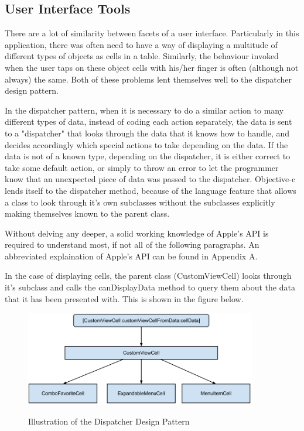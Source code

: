 \documentclass[se]{uw-wkrpt}
\begin{document}
\subsection{User Interface Tools}

There are a lot of similarity between facets of a user interface. Particularly in this
application, there was often need to have a way of displaying a multitude of different
types of objects as cells in a table. Similarly, the behaviour invoked when the user
taps on these object cells with his/her finger is often (although not always) the same.
Both of these problems lent themselves well to the dispatcher design pattern. 

In the dispatcher pattern,
when it is necessary to do a similar action to many different types of data, instead of coding
each action separately, the data is sent to a "dispatcher" that looks through the data that
it knows how to handle, and decides accordingly which special actions to take depending on
the data. If the data is not of a known type, depending on the dispatcher, it is either correct
to take some default action, or simply to throw an error to let the programmer know that 
an unexpected piece of data was passed to the dispatcher. Objective-c lends itself to the 
dispatcher method, because of the language feature that allows a class to look through it's
own subclasses without the subclasses explicitly making themselves known to the parent class.

Without delving any deeper, a solid working knowledge of Apple's API is required to understand
most, if not all of the following paragraphs. An abbreviated explaination of Apple's API can 
be found in Appendix A.

In the case of displaying cells, the parent class (CustomViewCell) looks through it's subclass
and calls the canDisplayData method to query them about the data that it has been presented with.
This is shown in the figure below.

\begin{figure}[h!]
  \caption{Illustration of the Dispatcher Design Pattern}
  \centering
    \includegraphics[width=0.9\textwidth]{customViewCellFlowchart}
  \label{fig:Dispatcher Pattern}
\end{figure}
\end{document}

